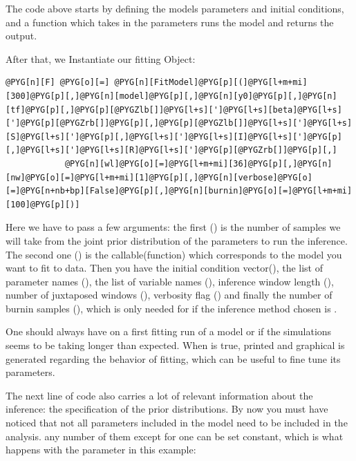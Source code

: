 \documentclass[a4paper,10pt,english]{manual}
\begin{document}
The code above starts by defining the models parameters and initial conditions, and a function which takes in the parameters runs the model and returns the output.

After that, we Instantiate our fitting Object:

\begin{Verbatim}[commandchars=@\[\]]
@PYG[n][F] @PYG[o][=] @PYG[n][FitModel]@PYG[p][(]@PYG[l+m+mi][300]@PYG[p][,]@PYG[n][model]@PYG[p][,]@PYG[n][y0]@PYG[p][,]@PYG[n][tf]@PYG[p][,]@PYG[p][@PYGZlb[]]@PYG[l+s][']@PYG[l+s][beta]@PYG[l+s][']@PYG[p][@PYGZrb[]]@PYG[p][,]@PYG[p][@PYGZlb[]]@PYG[l+s][']@PYG[l+s][S]@PYG[l+s][']@PYG[p][,]@PYG[l+s][']@PYG[l+s][I]@PYG[l+s][']@PYG[p][,]@PYG[l+s][']@PYG[l+s][R]@PYG[l+s][']@PYG[p][@PYGZrb[]]@PYG[p][,]
            @PYG[n][wl]@PYG[o][=]@PYG[l+m+mi][36]@PYG[p][,]@PYG[n][nw]@PYG[o][=]@PYG[l+m+mi][1]@PYG[p][,]@PYG[n][verbose]@PYG[o][=]@PYG[n+nb+bp][False]@PYG[p][,]@PYG[n][burnin]@PYG[o][=]@PYG[l+m+mi][100]@PYG[p][)]
\end{Verbatim}

Here we have to pass a few arguments: the first () is the number of samples we will take from the joint prior distribution of the parameters to run the inference. The second one () is the callable(function) which corresponds to the model you want to fit to data. Then you have the initial condition vector(), the list of parameter names (), the list of variable names (), inference window length (), number of juxtaposed windows (), verbosity flag () and finally the number of burnin samples (), which is only needed for if the inference method chosen is .

One should always have  on a first fitting run of a model or if the simulations seems to be taking longer than expected. When  is true, printed and graphical is generated regarding the behavior of fitting, which can be useful to fine tune its parameters.

The next line of code also carries a lot of relevant information about the inference: the specification of the prior distributions. By now you must have noticed that not all parameters included in the model need to be included in the analysis. any number of them except for one can be set constant, which is what happens with the parameter  in this example:
\end{document}
